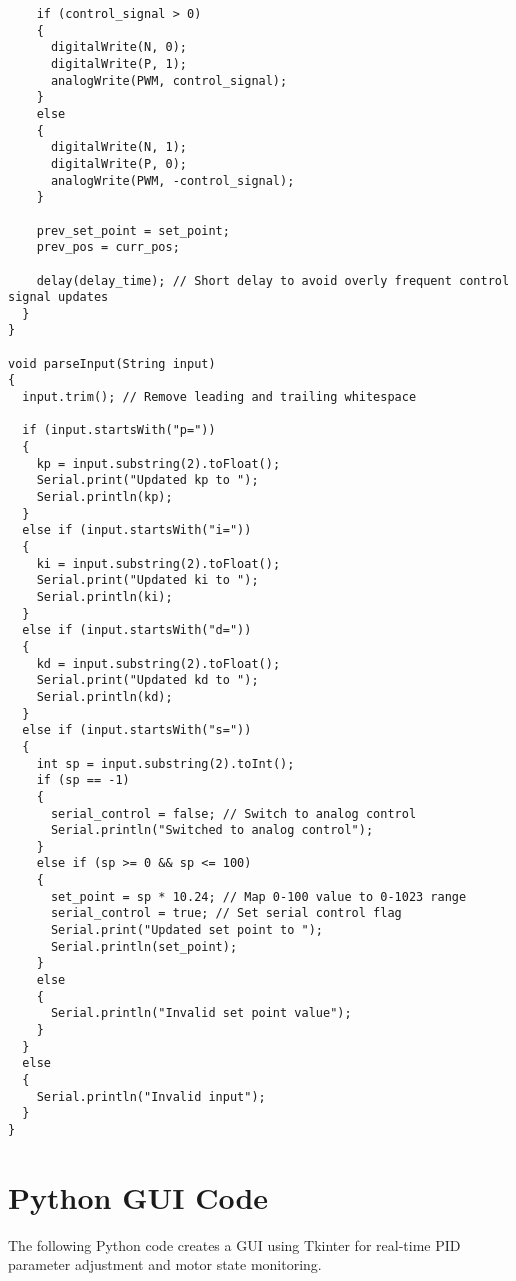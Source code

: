 \documentclass{article}
\begin{document}
\begin{verbatim}
    if (control_signal > 0)
    {
      digitalWrite(N, 0);
      digitalWrite(P, 1);
      analogWrite(PWM, control_signal);
    }
    else
    {
      digitalWrite(N, 1);
      digitalWrite(P, 0);
      analogWrite(PWM, -control_signal);
    }

    prev_set_point = set_point;
    prev_pos = curr_pos;

    delay(delay_time); // Short delay to avoid overly frequent control signal updates
  }
}

void parseInput(String input)
{
  input.trim(); // Remove leading and trailing whitespace

  if (input.startsWith("p="))
  {
    kp = input.substring(2).toFloat();
    Serial.print("Updated kp to ");
    Serial.println(kp);
  }
  else if (input.startsWith("i="))
  {
    ki = input.substring(2).toFloat();
    Serial.print("Updated ki to ");
    Serial.println(ki);
  }
  else if (input.startsWith("d="))
  {
    kd = input.substring(2).toFloat();
    Serial.print("Updated kd to ");
    Serial.println(kd);
  }
  else if (input.startsWith("s="))
  {
    int sp = input.substring(2).toInt();
    if (sp == -1)
    {
      serial_control = false; // Switch to analog control
      Serial.println("Switched to analog control");
    }
    else if (sp >= 0 && sp <= 100)
    {
      set_point = sp * 10.24; // Map 0-100 value to 0-1023 range
      serial_control = true; // Set serial control flag
      Serial.print("Updated set point to ");
      Serial.println(set_point);
    }
    else
    {
      Serial.println("Invalid set point value");
    }
  }
  else
  {
    Serial.println("Invalid input");
  }
}
\end{verbatim}

\section{Python GUI Code}
The following Python code creates a GUI using Tkinter for real-time PID parameter adjustment and motor state monitoring.
\end{document}
